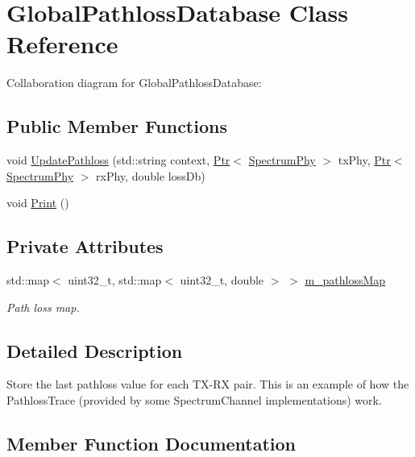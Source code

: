 \hypertarget{classGlobalPathlossDatabase}{}\section{Global\+Pathloss\+Database Class Reference}
\label{classGlobalPathlossDatabase}


Collaboration diagram for Global\+Pathloss\+Database\+:
\subsection*{Public Member Functions}
\begin{DoxyCompactItemize}
\item 
void \hyperlink{classGlobalPathlossDatabase_abbd4ad9e4abc663e21fab239a89e934f}{Update\+Pathloss} (std\+::string context, \hyperlink{classns3_1_1Ptr}{Ptr}$<$ \hyperlink{classns3_1_1SpectrumPhy}{Spectrum\+Phy} $>$ tx\+Phy, \hyperlink{classns3_1_1Ptr}{Ptr}$<$ \hyperlink{classns3_1_1SpectrumPhy}{Spectrum\+Phy} $>$ rx\+Phy, double loss\+Db)
\item 
void \hyperlink{classGlobalPathlossDatabase_acab59595a8e9daca4de05c5bee4c4d38}{Print} ()
\end{DoxyCompactItemize}
\subsection*{Private Attributes}
\begin{DoxyCompactItemize}
\item 
std\+::map$<$ uint32\+\_\+t, std\+::map$<$ uint32\+\_\+t, double $>$ $>$ \hyperlink{classGlobalPathlossDatabase_af9b1cf5534779885450d13833315ffcf}{m\+\_\+pathloss\+Map}
\begin{DoxyCompactList}\small\item\em Path loss map. \end{DoxyCompactList}\end{DoxyCompactItemize}


\subsection{Detailed Description}
Store the last pathloss value for each T\+X-\/\+RX pair. This is an example of how the Pathloss\+Trace (provided by some Spectrum\+Channel implementations) work. 

\subsection{Member Function Documentation}
